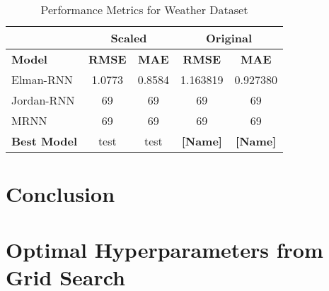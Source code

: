 \documentclass[conference, 10pt]{IEEEtran}
\begin{document}
\begin{table}[h]
    \centering
    \begin{tabular}{|l|c|c|c|c|}
        \hline
        &\multicolumn{2}{c|}{\textbf{Scaled}} & \multicolumn{2}{c|}{\textbf{Original}} \\ 
        \hline
        \textbf{Model}& \textbf{RMSE} & \textbf{MAE} & \textbf{RMSE} & \textbf{MAE} \\ 
        \hline
        Elman-RNN& 1.0773 & 0.8584 & 1.163819 & 0.927380 \\ 
        \hline
        Jordan-RNN & 69 & 69 & 69 & 69 \\ 
        \hline
        MRNN & 69 & 69 & 69 & 69 \\ 
        \hline
        \textbf{Best Model} & test & test & \textbf{[Name]} & \textbf{[Name]} \\ 
        \hline
    \end{tabular}
    \vspace{4pt}
    \caption{Performance Metrics for Weather Dataset}
    \label{tab:results_wtr}
\end{table}

\section{Conclusion}

\pagebreak

\nocite{myrepo}


\appendix
\section{Optimal Hyperparameters from Grid Search}

\end{document}
